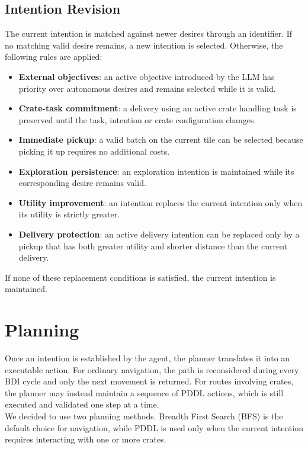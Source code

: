 \documentclass[11pt,a4paper]{article}
\begin{document}
\subsection{Intention Revision}
The current intention is matched against newer desires through an identifier. 
If no matching valid desire remains, a new intention is selected.
Otherwise, the following rules are applied:
\begin{itemize}
    \item \textbf{External objectives}: an active objective introduced by the LLM has priority over autonomous desires and remains selected while it is valid.
    \item \textbf{Crate-task commitment}: a delivery using an active crate handling task is preserved until the task, intention or crate configuration changes.
    \item \textbf{Immediate pickup}: a valid batch on the current tile can be selected because picking it up requires no additional costs.
    \item \textbf{Exploration persistence}: an exploration intention is maintained while its corresponding desire remains valid.
    \item \textbf{Utility improvement}: an intention replaces the current intention only when its utility is strictly greater.
    \item \textbf{Delivery protection}: an active delivery intention can be replaced only by a pickup that has both greater utility and shorter distance than the current delivery.
\end{itemize}
If none of these replacement conditions is satisfied, the current intention is maintained. 

\section{Planning}
Once an intention is established by the agent, the planner translates it into an executable action.
For ordinary navigation, the path is reconsidered during every BDI cycle and only the next movement is returned. 
For routes involving crates, the planner may instead maintain a sequence of PDDL actions, which is still executed and validated one step at a time.
\\We decided to use two planning methods. 
Breadth First Search (BFS) is the default choice for navigation, while PDDL is used only when the current intention requires interacting with one or more crates.
\end{document}
